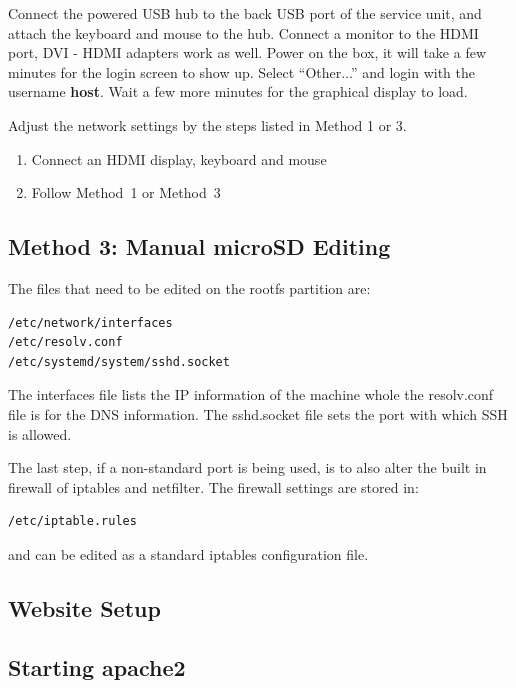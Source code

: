 \documentclass[12pt, letterpaper, onecolumn, oneside]{article}
\begin{document}
Connect the powered USB hub to the back USB port of the service unit, and attach the keyboard and mouse to the hub.
Connect a monitor to the HDMI port, DVI - HDMI adapters work as well.
Power on the box, it will take a few minutes for the login screen to show up.
Select ``Other...'' and login with the username \textbf{host}.
Wait a few more minutes for the graphical display to load.

Adjust the network settings by the steps listed in Method 1 or 3.

\begin{enumerate}
\item{Connect an HDMI display, keyboard and mouse}
\item{Follow Method~1 or Method~3}
\end{enumerate}


\subsection*{Method 3: Manual microSD Editing}

The files that need to be edited on the rootfs partition are:

\begin{verbatim}
/etc/network/interfaces
/etc/resolv.conf
/etc/systemd/system/sshd.socket
\end{verbatim}

The interfaces file lists the IP information of the machine whole the resolv.conf file is for the DNS information.
The sshd.socket file sets the port with which SSH is allowed.

The last step, if a non-standard port is being used, is to also alter the built in firewall of iptables and netfilter.
The firewall settings are stored in:

\begin{verbatim}
/etc/iptable.rules
\end{verbatim}

and can be edited as a standard iptables configuration file.

\subsection{Website Setup}
\label{app:gumstix:website}

\subsection*{Starting apache2}
\end{document}
